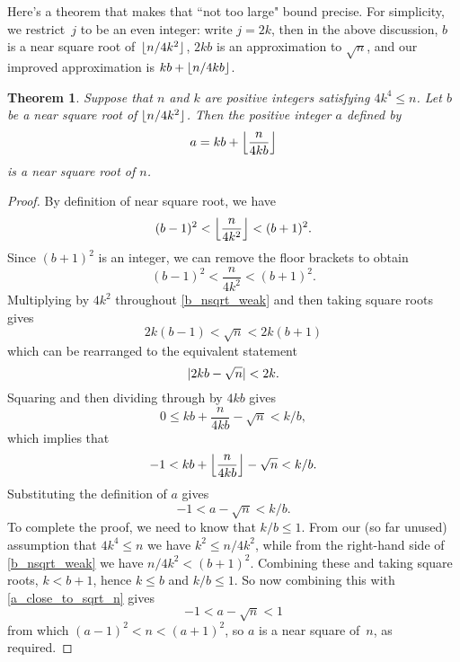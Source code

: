 \documentclass[a4paper]{article}
\DeclarePairedDelimiter\floor{\lfloor}{\rfloor}
\DeclarePairedDelimiter\abs{\lvert}{\rvert}
\theoremstyle{plain}
\newtheorem{theorem}{Theorem}
\theoremstyle{definition}
\begin{document}
Here's a theorem that makes that ``not too large" bound precise. For
simplicity, we restrict~$j$ to be an even integer: write $j = 2k$, then in the
above discussion, $b$ is a near square root of~$\floor{n / 4k^2}$, $2kb$ is an
approximation to $\sqrt n$, and our improved approximation is $kb + \floor{n /
4kb}$.

\begin{theorem}\label{main_theorem}
  Suppose that $n$ and $k$ are positive integers satisfying $4k^4 \le n$. Let
  $b$ be a near square root of $\floor{n / 4k^2}$. Then the positive integer
  $a$ defined by
  $$a = kb + \floor*{\frac{n}{4kb}}$$
  is a near square root of $n$.
\end{theorem}

\begin{proof}
  By definition of near square root, we have
  \begin{equation}\label{b_nsqrt}
    (b - 1)^2 < \floor*{\frac{n}{4k^2}} < (b + 1)^2.
  \end{equation}
  Since $(b + 1)^2$ is an integer, we can remove the floor brackets to obtain
  \begin{equation}\label{b_nsqrt_weak}
    (b - 1)^2 < \frac{n}{4k^2} < (b + 1)^2.
  \end{equation}
  Multiplying by $4k^2$ throughout \eqref{b_nsqrt_weak} and then taking square
  roots gives
  \begin{equation}
    2k(b - 1) < \sqrt n < 2k(b + 1)
  \end{equation}
  which can be rearranged to the equivalent statement
  \begin{equation}
    \abs{2kb - \sqrt n} < 2k.
  \end{equation}
  Squaring and then dividing through by $4kb$ gives
  \begin{equation}
    0 \le kb + \frac{n}{4kb} - \sqrt n < k/b,
  \end{equation}
  which implies that
  \begin{equation}
    -1 < kb + \floor*{\frac{n}{4kb}} - \sqrt n < k/b.
  \end{equation}
  Substituting the definition of $a$ gives
  \begin{equation}\label{a_close_to_sqrt_n}
    -1 < a - \sqrt n < k/b.
  \end{equation}
  To complete the proof, we need to know that $k / b \le 1$. From our (so far
  unused) assumption that $4k^4 \le n$ we have $k^2 \le n / 4k^2$, while from
  the right-hand side of \eqref{b_nsqrt_weak} we have $n / 4k^2 < (b + 1)^2$.
  Combining these and taking square roots, $k < b + 1$, hence $k \le b $ and $k
  / b \le 1$. So now combining this with \eqref{a_close_to_sqrt_n} gives
  \begin{equation}
    -1 < a - \sqrt n < 1
  \end{equation}
  from which $(a - 1)^2 < n < (a + 1)^2$, so $a$ is a near square of~$n$, as
  required.
\end{proof}
\end{document}

